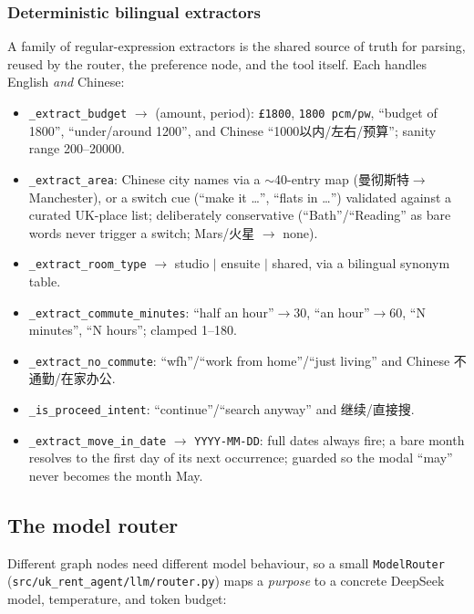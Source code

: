 \documentclass[11pt,a4paper]{article}
\newcommand{\code}[1]{\texttt{\small #1}}
\begin{document}
\subsubsection*{Deterministic bilingual extractors}
A family of regular-expression extractors is the shared source of truth for parsing,
reused by the router, the preference node, and the tool itself. Each handles English
\emph{and} Chinese:
\begin{itemize}[leftmargin=1.4em,itemsep=1pt]
  \item \code{\_extract\_budget} $\to$ (amount, period): \code{\pounds1800},
        \code{1800 pcm/pw}, ``budget of 1800'', ``under/around 1200'', and Chinese
        ``1000以内/左右/预算''; sanity range 200--20000.
  \item \code{\_extract\_area}: Chinese city names via a $\sim$40-entry map
        (曼彻斯特$\to$Manchester), or a switch cue (``make it \dots'', ``flats in \dots'')
        validated against a curated UK-place list; deliberately conservative
        (``Bath''/``Reading'' as bare words never trigger a switch; Mars/火星 $\to$ none).
  \item \code{\_extract\_room\_type} $\to$ studio $\mid$ ensuite $\mid$ shared, via a
        bilingual synonym table.
  \item \code{\_extract\_commute\_minutes}: ``half an hour''$\to$30, ``an hour''$\to$60,
        ``N minutes'', ``N hours''; clamped 1--180.
  \item \code{\_extract\_no\_commute}: ``wfh''/``work from home''/``just living'' and
        Chinese 不通勤/在家办公.
  \item \code{\_is\_proceed\_intent}: ``continue''/``search anyway'' and 继续/直接搜.
  \item \code{\_extract\_move\_in\_date} $\to$ \code{YYYY-MM-DD}: full dates always fire;
        a bare month resolves to the first day of its next occurrence; guarded so the
        modal ``may'' never becomes the month May.
\end{itemize}

\subsection{The model router}
\label{sec:llmrouter}
Different graph nodes need different model behaviour, so a small \code{ModelRouter}
(\code{src/\allowbreak uk\_rent\_agent/\allowbreak llm/router.py}) maps a \emph{purpose} to a concrete
DeepSeek model, temperature, and token budget:
\end{document}
